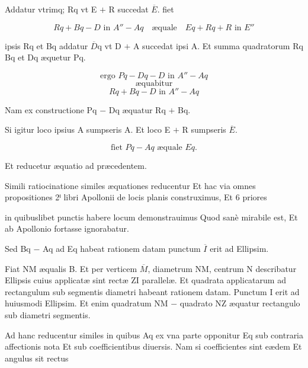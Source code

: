 \documentclass[11pt,a4paper]{article}
\begin{document}
Addatur vtrimq; Rq vt E $+$ R succedat $\overline{E}$. fiet

\[ Rq + Bq - D \text{ in } A'' - Aq \quad \text{æquale} \quad Eq + Rq + R \text{ in } E'' \]

ipsis Rq et Bq addatur $\overline{D}$q vt D $+$ A succedat ipsi A. Et summa quadratorum Rq Bq et Dq æquetur Pq.

\[ \text{ergo } Pq - Dq - D \text{ in } A'' - Aq \]
\[ \text{æquabitur} \]
\[ Rq + Bq - D \text{ in } A'' - Aq \]

Nam ex constructione Pq $-$ Dq æquatur Rq $+$ Bq.

Si igitur loco ipsius A sumpseris A. Et loco E $+$ R sumpseris $\overline{E}$.

\[ \text{fiet } Pq - Aq \text{ æquale } Eq. \]

Et reducetur æquatio ad præcedentem.

Simili ratiocinatione similes æquationes reducentur Et hac via omnes propositiones 2ⁱ libri Apollonii de locis planis construximus, Et 6 priores


in quibuslibet punctis habere locum demonstrauimus Quod sanè mirabile est, Et ab Apollonio fortasse ignorabatur.

Sed Bq $-$ Aq ad Eq habeat rationem datam punctum $\overline{I}$ erit ad Ellipsim.

Fiat NM æqualis B. Et per verticem $\overline{M}$, diametrum NM, centrum N describatur Ellipsis cuius applicatæ sint rectæ ZI parallelæ. Et quadrata applicatarum ad rectangulum sub segmentis diametri habeant rationem datam. Punctum I erit ad huiusmodi Ellipsim. Et enim quadratum NM $-$ quadrato NZ æquatur rectangulo sub diametri segmentis.

Ad hanc reducentur similes in quibus Aq ex vna parte opponitur Eq sub contraria affectionis nota Et sub coefficientibus diuersis. Nam si coefficientes sint eædem Et angulus sit rectus
\end{document}
